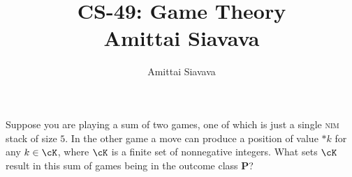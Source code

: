 \documentclass[11pt, reqno]{amsart}
\begin{document}

\title{CS-49: Game Theory\\ Amittai Siavava \\ }
\author{Amittai Siavava}


\setlength{\headheight}{13.0pt}
\setlength{\footskip}{15.0pt}

\maketitle

\bigskip

\def \cram { \textsc{cram} }
\def \dom { \textsc{domineering} }
\def \sub { \textsc{subtraction} }
\def \weighted { \textsc{weighted odds and evens}}
\def \nim { \textsc{nim} }
\def \P { \mathbf{P}}

\newpage
\begin{problem}[10]
  Suppose you are playing a sum of two games,
  one of which is just a single \nim stack of size $5$.
  In the other game a move can produce a position of value $\ast k$ for any $k \in \cK$,
  where $\cK$ is a finite set of nonnegative integers.
  What sets $\cK$ result in this sum of games being in the outcome class $\P$?
\end{problem}
\end{document}
